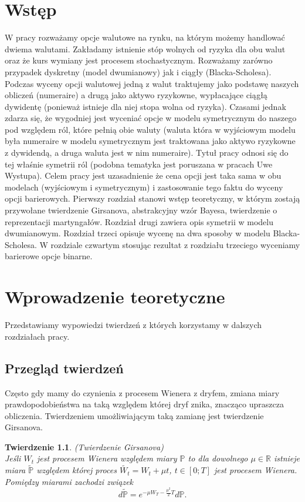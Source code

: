 \documentclass[11pt]{report}
\newtheorem{tw}{Twierdzenie}[chapter]
\begin{document}
\chapter*{Wstęp}
W pracy rozważamy opcje walutowe na rynku, na którym możemy handlować dwiema walutami. Zakładamy istnienie stóp wolnych od ryzyka dla obu walut oraz że kurs wymiany jest procesem stochastycznym. Rozważamy zarówno przypadek dyskretny (model dwumianowy) jak i ciągły (Blacka-Scholesa). \\ 
\indent Podczas wyceny opcji walutowej jedną z walut traktujemy jako podstawę naszych obliczeń (numeraire) a drugą jako aktywo ryzykowne, wypłacające ciągłą dywidentę (ponieważ istnieje dla niej stopa wolna od ryzyka). Czasami jednak zdarza się, że wygodniej jest wyceniać opcje w modelu symetrycznym do naszego pod względem ról, które pełnią obie waluty (waluta która w wyjściowym modelu była numeraire w modelu symetrycznym jest traktowana jako aktywo ryzykowne z dywidendą, a druga waluta jest w nim numeraire).
Tytuł pracy odnosi się do tej właśnie symetrii ról (podobna tematyka jest poruszana w pracach Uwe Wystupa).
 Celem pracy jest uzasadnienie że cena opcji jest taka sama w obu modelach (wyjściowym i symetrycznym) i zastosowanie tego faktu do wyceny opcji barierowych.
Pierwszy rozdział stanowi wstęp teoretyczny, w którym zostają przywołane twierdzenie Girsanova, abstrakcyjny wzór Bayesa, twierdzenie o reprezentacji martyngałów. 
Rozdział drugi zawiera opis symetrii w modelu dwumianowym.
Rozdział trzeci opisuje wycenę na dwa sposoby w modelu Blacka-Scholesa.
W rozdziale czwartym stosując rezultat z rozdziału trzeciego wyceniamy barierowe opcje binarne. 



\chapter{Wprowadzenie teoretyczne}
Przedstawiamy wypowiedzi twierdzeń z których korzystamy w dalszych rozdziałach pracy.

\section{Przegląd twierdzeń}
Często gdy mamy do czynienia z procesem Wienera z dryfem, zmiana miary prawdopodobieństwa na taką względem której dryf znika, znacząco upraszcza obliczenia. Twierdzeniem umożliwiającym taką zamianę jest twierdzenie Girsanova.  

\begin{tw}(Twierdzenie Girsanova) $ $ \\
Jeśli $W_t$ jest procesem Wienera względem miary $ \mathbb{P} $ to dla dowolnego $ \mu \in \mathbb{R} $ istnieje miara $ \widetilde{\mathbb{P}} $ względem której proces $ \widetilde{W_t} = W_t + \mu t $, $t \in [0 ; T]$ jest procesem Wienera. \\

Pomiędzy miarami zachodzi związek $$d\mathbb{\tilde{P}} = e^{-\mu W_T - \frac{\mu^2}{2}T}d\mathbb{P}.$$
\end{tw}
\vspace{1cm}  
\end{document}
